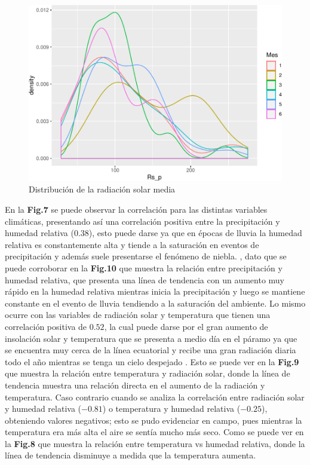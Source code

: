 \documentclass[conference,final,]{IEEEtran}
\makeatletter
\def\maxwidth{\ifdim\Gin@nat@width>\linewidth\linewidth
\else\Gin@nat@width\fi}
\let\Oldincludegraphics\includegraphics
\renewcommand{\includegraphics}[1]{\Oldincludegraphics[width=\maxwidth]{#1}}
\makeatother
\begin{document}
\begin{figure}
\centering
\includegraphics{Hidrology_files/figure-latex/unnamed-chunk-14-1.pdf}
\caption{Distribución de la radiación solar media}
\end{figure}

En la \textbf{Fig.7} se puede observar la correlación para las distintas
variables climáticas, presentando así una correlación positiva entre la
precipitación y humedad relativa (\(0.38\)), esto puede darse ya que en
épocas de lluvia la humedad relativa es constantemente alta y tiende a
la saturación en eventos de precipitación y además suele presentarse el
fenómeno de niebla. \cite{morales2019atlas}, dato que se puede
corroborar en la \textbf{Fig.10} que muestra la relación entre
precipitación y humedad relativa, que presenta una línea de tendencia
con un aumento muy rápido en la humedad relativa mientras inicia la
precipitación y luego se mantiene constante en el evento de lluvia
tendiendo a la saturación del ambiente. Lo mismo ocurre con las
variables de radiación solar y temperatura que tienen una correlación
positiva de \(0.52\), la cual puede darse por el gran aumento de
insolación solar y temperatura que se presenta a medio día en el páramo
ya que se encuentra muy cerca de la línea ecuatorial y recibe una gran
radiación diaria todo el año mientras se tenga un cielo despejado
\cite{buytaert2006hidrologia}. Esto se puede ver en la \textbf{Fig.9}
que muestra la relación entre temperatura y radiación solar, donde la
línea de tendencia muestra una relación directa en el aumento de la
radiación y temperatura. Caso contrario cuando se analiza la correlación
entre radiación solar y humedad relativa (\(-0.81\)) o temperatura y
humedad relativa (\(-0.25\)), obteniendo valores negativos; esto se pudo
evidenciar en campo, pues mientras la temperatura era más alta el aire
se sentía mucho más seco. Como se puede ver en la \textbf{Fig.8} que
muestra la relación entre temperatura vs humedad relativa, donde la
línea de tendencia disminuye a medida que la temperatura aumenta.
\end{document}
